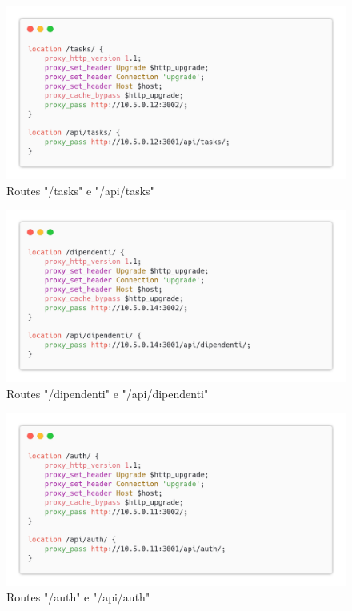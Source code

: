 \documentclass{report}
\begin{document}
\begin{figure}[H]
	\centering\includegraphics[width=1\textwidth]{images/nginx_config_tasks.png}
	Routes "/tasks" e "/api/tasks"
\end{figure}
\begin{figure}[H]
	\centering\includegraphics[width=1\textwidth]{images/nginx_config_dipendenti.png}
	Routes "/dipendenti" e "/api/dipendenti"
\end{figure}
\begin{figure}[H]
	\centering\includegraphics[width=1\textwidth]{images/nginx_config_auth.png}
	Routes "/auth" e "/api/auth"
\end{figure}
\end{document}
